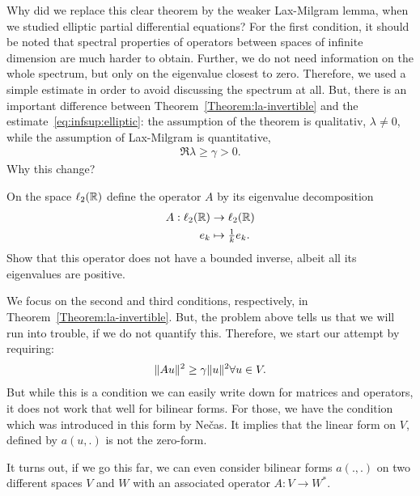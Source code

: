 \begin{intro}
  Why did we replace this clear theorem by the weaker Lax-Milgram
  lemma, when we studied elliptic partial differential equations?  For
  the first condition, it should be noted that spectral properties of
  operators between spaces of infinite dimension are much harder to
  obtain. Further, we do not need information on the whole spectrum,
  but only on the eigenvalue closest to zero. Therefore, we used a
  simple estimate in order to avoid discussing the spectrum at
  all. But, there is an important difference between
  Theorem~\ref{Theorem:la-invertible} and the
  estimate~\eqref{eq:infsup:elliptic}: the assumption of the theorem
  is qualitativ, $\lambda \neq 0$, while the assumption of Lax-Milgram
  is quantitative,
  \begin{gather*}
    \Re\lambda \ge \gamma> 0.
  \end{gather*}
  Why this change?
\end{intro}

\begin{problem}
  On the space $\ell_2(\mathbb R)$ define the operator $A$ by its eigenvalue
  decomposition
  \begin{align*}
    A: \ell_2(\mathbb R) &\to \ell_2(\mathbb R)\\
    e_k & \mapsto \tfrac1k e_k.
  \end{align*}
  Show that this operator does not have a bounded inverse, albeit all
  its eigenvalues are positive.
\end{problem}

\begin{intro}
  We focus on the second and third conditions, respectively, in
  Theorem~\ref{Theorem:la-invertible}.
  But, the problem above tells us that we
  will run into trouble, if we do not quantify this. Therefore, we
  start our attempt by requiring:
  \begin{gather*}
    \lVert Au\rVert^2 \ge \gamma \lVert u\rVert^2 \forall u\in V.
  \end{gather*}
  But while this is a condition we can easily write down for matrices
  and operators, it does not work that well for bilinear forms. For
  those, we have the condition which was introduced in this form by
  Nečas. It implies that the linear form on $V$, defined by $a(u,.)$
  is not the zero-form.

  It turns out, if we go this far, we can even consider bilinear forms
  $a(.,.)$ on two different spaces $V$ and $W$ with an associated
  operator $A: V\to W^*$.
\end{intro}

